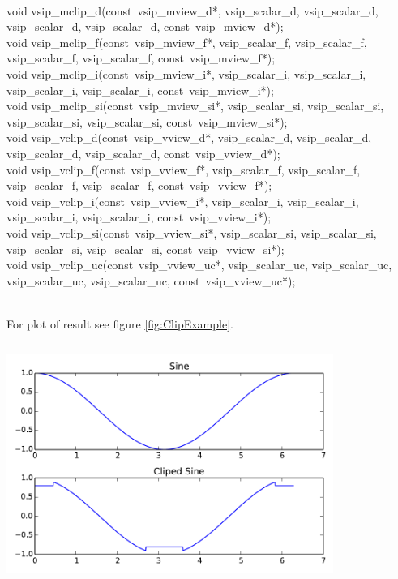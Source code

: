 \\\cvsiplh
\begin{cfuncs}
void vsip\_mclip\_d(const~vsip\_mview\_d*, vsip\_scalar\_d, vsip\_scalar\_d, vsip\_scalar\_d, vsip\_scalar\_d, const~vsip\_mview\_d*);\Bs\\
void vsip\_mclip\_f(const~vsip\_mview\_f*, vsip\_scalar\_f, vsip\_scalar\_f, vsip\_scalar\_f, vsip\_scalar\_f, const~vsip\_mview\_f*);\Bs\\
void vsip\_mclip\_i(const~vsip\_mview\_i*, vsip\_scalar\_i, vsip\_scalar\_i, vsip\_scalar\_i, vsip\_scalar\_i, const~vsip\_mview\_i*);\Bs\\
void vsip\_mclip\_si(const~vsip\_mview\_si*, vsip\_scalar\_si, vsip\_scalar\_si, vsip\_scalar\_si, vsip\_scalar\_si, const~vsip\_mview\_si*);\Bs\\
void vsip\_vclip\_d(const~vsip\_vview\_d*, vsip\_scalar\_d, vsip\_scalar\_d, vsip\_scalar\_d, vsip\_scalar\_d, const~vsip\_vview\_d*);\Bs\\
void vsip\_vclip\_f(const~vsip\_vview\_f*, vsip\_scalar\_f, vsip\_scalar\_f, vsip\_scalar\_f, vsip\_scalar\_f, const~vsip\_vview\_f*);\Bs\\
void vsip\_vclip\_i(const~vsip\_vview\_i*, vsip\_scalar\_i, vsip\_scalar\_i, vsip\_scalar\_i, vsip\_scalar\_i, const~vsip\_vview\_i*);\Bs\\
void vsip\_vclip\_si(const~vsip\_vview\_si*, vsip\_scalar\_si, vsip\_scalar\_si, vsip\_scalar\_si, vsip\_scalar\_si, const~vsip\_vview\_si*);\Bs\\
void vsip\_vclip\_uc(const~vsip\_vview\_uc*, vsip\_scalar\_uc, vsip\_scalar\_uc, vsip\_scalar\_uc, vsip\_scalar\_uc, const~vsip\_vview\_uc*);\Bs\\
\end{cfuncs}
\pyjvsiph
{}
%
\\
\hspace*{.08\textwidth}
{\rmfamily For plot of result see figure \ref{fig:ClipExample}.}
\inputminted[linenos=true,resetmargins=true,xleftmargin=.12\textwidth,fontfamily=tt,fontsize=\small]{python}{./pyJvsip_examples/eXclip.py}
\begin{minipage}[c]{\textwidth}\centering\includegraphics[width=0.8\textwidth]{./pyJvsip_examples/eXclip}
\label{fig:ClipExample}\end{minipage}
